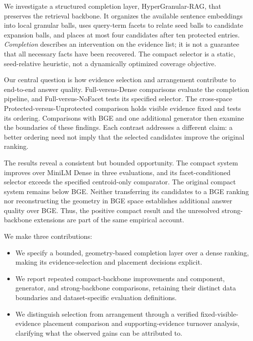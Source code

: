 \documentclass[11pt]{article}
\newcommand{\hgrag}{HyperGranular-RAG\xspace}
\begin{document}
We investigate a structured completion layer, \hgrag, that preserves the
retrieval backbone. It organizes the available sentence embeddings into local
granular balls, uses query-term facets to relate seed balls to candidate
expansion balls, and places at most four candidates after ten protected
entries. \emph{Completion} describes an intervention on the evidence list; it is
not a guarantee that all necessary facts have been recovered. The compact
selector is a static, seed-relative heuristic, not a dynamically optimized
coverage objective.

Our central question is how evidence selection and arrangement contribute to
end-to-end answer quality. Full-versus-Dense comparisons evaluate the
completion pipeline, and Full-versus-NoFacet tests its specified selector.
The cross-space Protected-versus-Unprotected comparison holds visible evidence
fixed and tests its ordering. Comparisons with BGE and one additional
generator then examine the boundaries of these findings. Each contrast
addresses a different claim: a better ordering need not imply that the
selected candidates improve the original ranking.

The results reveal a consistent but bounded opportunity. The compact system
improves over MiniLM Dense in three evaluations, and its facet-conditioned
selector exceeds the specified centroid-only comparator. The original compact
system remains below BGE. Neither transferring its candidates to a BGE
ranking nor reconstructing the geometry in BGE space establishes additional
answer quality over BGE. Thus, the positive compact result and the unresolved
strong-backbone extensions are part of the same empirical account.

We make three contributions:
\begin{itemize}
\item We specify a bounded, geometry-based completion layer over a dense
ranking, making its evidence-selection and placement decisions explicit.
\item We report repeated compact-backbone improvements and component,
generator, and strong-backbone comparisons, retaining their distinct data
boundaries and dataset-specific evaluation definitions.
\item We distinguish selection from arrangement through a verified
fixed-visible-evidence placement comparison and supporting-evidence turnover
analysis, clarifying what the observed gains can be attributed to.
\end{itemize}
\end{document}

